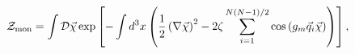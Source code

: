 \begin{equation}
\label{2}
{\cal Z}_{\rm mon}=
\int {\cal D}\vec\chi\exp\left[-\int d^3x\left(\frac12\left(\nabla\vec\chi\right)^2-2\zeta\sum\limits_{i=1}^{N(N-1)/2}
\cos\left(g_m\vec q_i\vec\chi\right)\right)\right],
\end{equation}

